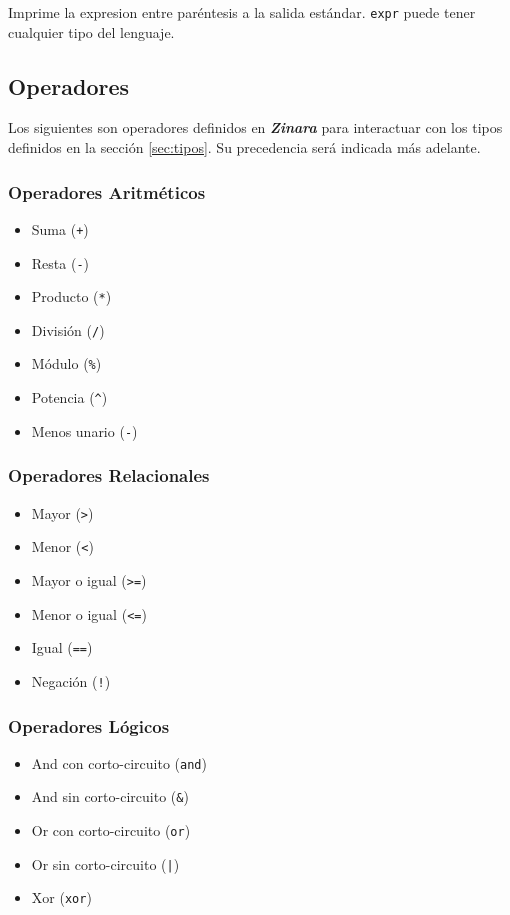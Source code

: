 \documentclass[12pt, spanish]{report}
\begin{document}
Imprime la expresion entre par\'entesis a la salida
est\'andar. \texttt{expr} puede tener cualquier tipo del lenguaje.

\subsection{Operadores}
\label{sec:ops}
Los siguientes son operadores definidos en \emph{\textbf{Zinara}} para
interactuar con los tipos definidos en la secci\'on \ref{sec:tipos}. Su precedencia ser\'a indicada m\'as adelante.

\subsubsection{Operadores Aritm\'eticos}
\begin{itemize}
\item Suma (\texttt{+})
\item Resta    (\texttt{-})
\item Producto (\texttt{*})
\item Divisi\'on  (\texttt{/})
\item M\'odulo (\texttt{\%})
\item Potencia (\texttt{\^})
\item Menos unario (\texttt{-})
\end{itemize}

\subsubsection{Operadores Relacionales}
\begin{itemize}
\item Mayor         (\texttt{>})
\item Menor         (\texttt{<})
\item Mayor o igual (\texttt{>=})
\item Menor o igual (\texttt{<=})
\item Igual (\texttt{==})
\item Negaci\'on      (\texttt{!})
\end{itemize}

\subsubsection{Operadores L\'ogicos}
\begin{itemize}
\item And con corto-circuito (\texttt{and})
\item And sin corto-circuito (\texttt{\&})
\item Or con corto-circuito  (\texttt{or})
\item Or sin corto-circuito  (\texttt{|})
\item Xor (\texttt{xor})
\end{itemize}
\end{document}
